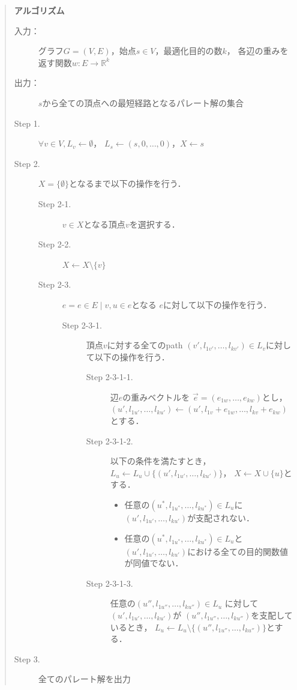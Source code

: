 \documentclass[12pt]{optlab-bachelor}
\begin{document}
\begin{quote}
  \textbf{アルゴリズム}
  \begin{description}
    \item[入力：] グラフ$G=(V,E)$，始点$s \in V$，最適化目的の数$k$，
    各辺の重みを返す関数$w : E \to \mathbb{R}^k$
    \item[出力：] $s$から全ての頂点への最短経路となるパレート解の集合
    \item[Step 1.] $\forall v \in V , L_v \leftarrow \emptyset$，
    $L_s \leftarrow (s,0,\ldots,0)$，$X \leftarrow s$
    \item[Step 2.] $X = \{\emptyset\}$となるまで以下の操作を行う．
    \begin{description}
      \item[Step 2-1.] $v \in X$となる頂点$v$を選択する．
      \item[Step 2-2.] $X \leftarrow X \setminus \{ v \}$
      \item[Step 2-3.] $e = {e \in E \mid v,u \in e}$となる
      $e$に対して以下の操作を行う．
      \begin{description}
        \item[Step 2-3-1.] 頂点$v$に対する全てのpath
        $(v',l_{1v'},\ldots,l_{kv'}) \in L_v$に対して以下の操作を行う．
        \begin{description}
          \item[Step 2-3-1-1.] 辺$e$の重みベクトルを
          $\vec{e} = (e_{1w},\ldots,e_{kw})$とし，
          $(u',l_{1u'},\ldots,l_{ku'}) \leftarrow
          (u',l_{1v}+e_{1w},\ldots,l_{kv}+e_{kw})$とする．
          \item[Step 2-3-1-2.] 以下の条件を満たすとき，
          $L_u \leftarrow L_u \cup \{(u',l_{1u'},\ldots,l_{ku'})\}$，
          $X \leftarrow X \cup \{ u\}$とする．
          \begin{itemize}
            \item 任意の$(u^*,l_{1u^*},\ldots,l_{ku^*})\in L_u$に
            $(u',l_{1u'},\ldots,l_{ku'})$が支配されない．
            \item 任意の$(u^*,l_{1u^*},\ldots,l_{ku^*}) \in L_u$と
            $(u',l_{1u'},\ldots,l_{ku'})$における全ての目的関数値が同値でない．
          \end{itemize}
          \item[Step 2-3-1-3.] 任意の$(u'',l_{1u''},\ldots,l_{ku''})\in L_u$
          に対して$(u',l_{1u'},\ldots,l_{ku'})$が
          $(u'',l_{1u''},\ldots,l_{ku''})$を支配しているとき，
          $L_u \leftarrow L_u \setminus \{(u'',l_{1u''},\ldots,l_{ku''})\}$とする．
        \end{description}
      \end{description}
    \end{description}
    \item[Step 3.] 全てのパレート解を出力
  \end{description}
\end{quote}
\end{document}
